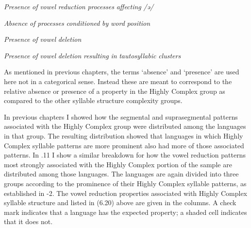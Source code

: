 \textit{Presence} \textit{of} \textit{vowel} \textit{reduction} \textit{processes} \textit{affecting} \textit{/ə/}



\textit{Absence} \textit{of} \textit{processes} \textit{conditioned} \textit{by} \textit{word} \textit{position}



\textit{Presence} \textit{of} \textit{vowel} \textit{deletion}



\textit{Presence} \textit{of} \textit{vowel} \textit{deletion} \textit{resulting} \textit{in} \textit{tautosyllabic} \textit{clusters}


\z

  As mentioned in previous chapters, the terms ‘absence’ and ‘presence’ are used here not in a categorical sense. Instead these are meant to correspond to the relative absence or presence of a property in the Highly Complex group as compared to the other syllable structure complexity groups.



  In previous chapters I showed how the segmental and suprasegmental patterns associated with the Highly Complex group were distributed among the languages in that group. The resulting distribution showed that languages in which Highly Complex syllable patterns are more prominent also had more of those associated patterns. In .11 I show a similar breakdown for how the vowel reduction patterns most strongly associated with the Highly Complex portion of the sample are distributed among those languages. The languages are again divided into three groups according to the prominence of their Highly Complex syllable patterns, as established in -2. The vowel reduction properties associated with Highly Complex syllable structure and listed in (6.20) above are given in the columns. A check mark indicates that a language has the expected property; a shaded cell indicates that it does not. 






